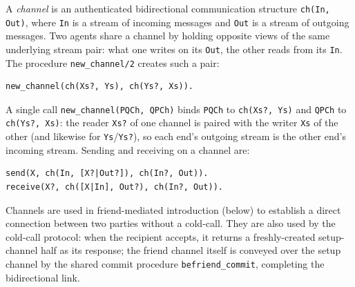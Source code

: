 A \emph{channel} is an authenticated bidirectional communication structure \verb|ch(In, Out)|, where \verb|In| is a stream of incoming messages and \verb|Out| is a stream of outgoing messages. Two agents share a channel by holding opposite views of the same underlying stream pair: what one writes on its \verb|Out|, the other reads from its \verb|In|. The procedure \verb|new_channel/2| creates such a pair:
\begin{verbatim}
new_channel(ch(Xs?, Ys), ch(Ys?, Xs)).
\end{verbatim}
A single call \verb|new_channel(PQCh, QPCh)| binds \verb|PQCh| to \verb|ch(Xs?, Ys)| and \verb|QPCh| to \verb|ch(Ys?, Xs)|: the reader \verb|Xs?| of one channel is paired with the writer \verb|Xs| of the other (and likewise for \verb|Ys|/\verb|Ys?|), so each end's outgoing stream is the other end's incoming stream. Sending and receiving on a channel are:
\begin{verbatim}
send(X, ch(In, [X?|Out?]), ch(In?, Out)).
receive(X?, ch([X|In], Out?), ch(In?, Out)).
\end{verbatim}
Channels are used in friend-mediated introduction (below) to establish a direct connection between two parties without a cold-call. They are also used by the cold-call protocol: when the recipient accepts, it returns a freshly-created setup-channel half as its response; the friend channel itself is conveyed over the setup channel by the shared commit procedure \verb|befriend_commit|, completing the bidirectional link.

